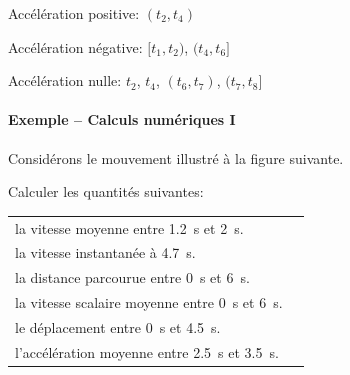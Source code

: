 Accélération positive: $(t_2, t_4)$

Accélération négative: $[t_1, t_2)$, $(t_4, t_6]$

Accélération nulle: $t_2$, $t_4$, $(t_6, t_7)$, $(t_7, t_8]$


\paragraph{Exemple -- Calculs numériques I}
Considérons le mouvement illustré à la figure suivante.

\begin{center}
\end{center}

Calculer les quantités suivantes:

\begin{tabular}{ll}
  la vitesse moyenne entre \SI{1,2}{\second} et \SI{2}{\second}.
  & \color{blue}{$v_{\mathrm{moy},x} = \SI{-1.00}{\meter\per\second}$} \\
  
  la vitesse instantanée à \SI{4.7}{\second}.
  & \color{blue}{$v_x = \SI{2.00}{\meter\per\second}$} \\

  la distance parcourue entre \SI{0}{\second} et \SI{6}{\second}.
  & \color{blue}{$d = \SI{4.00}{\meter}$} \\

  la vitesse scalaire moyenne entre \SI{0}{\second} et \SI{6}{\second}.
  & \color{blue}{$v_s = \SI{0.667}{\meter\per\second}$} \\

  le déplacement entre \SI{0}{\second} et \SI{4.5}{\second}.
  & \color{blue}{$\Delta x = \SI{-1.00}{\meter}$} \\

  l'accélération moyenne entre \SI{2.5}{\second} et \SI{3.5}{\second}.
  & \color{blue}{$a_{\mathrm{moy}, x} = \SI{1.00}{\meter\per\second\squared}$} \\
\end{tabular}


